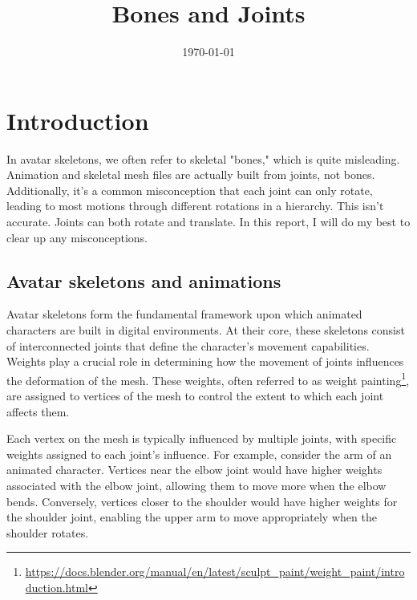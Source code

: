 \documentclass{uva-inf-article}
\title{Bones and Joints}
\date{\today}
\begin{document}
\maketitle


\section{Introduction}
In avatar skeletons, we often refer to skeletal "bones," which is quite misleading. Animation and skeletal mesh files are actually built from joints, not bones. Additionally, it's a common misconception that each joint can only rotate, leading to most motions through different rotations in a hierarchy. This isn't accurate. Joints can both rotate and translate. In this report, I will do my best to clear up any misconceptions.

\subsection{Avatar skeletons and animations}
Avatar skeletons form the fundamental framework upon which animated characters are built in digital environments. At their core, these skeletons consist of interconnected joints that define the character's movement capabilities. Weights play a crucial role in determining how the movement of joints influences the deformation of the mesh. These weights, often referred to as weight painting\footnote{\url{https://docs.blender.org/manual/en/latest/sculpt_paint/weight_paint/introduction.html}}, are assigned to vertices of the mesh to control the extent to which each joint affects them.

Each vertex on the mesh is typically influenced by multiple joints, with specific weights assigned to each joint's influence. For example, consider the arm of an animated character. Vertices near the elbow joint would have higher weights associated with the elbow joint, allowing them to move more when the elbow bends. Conversely, vertices closer to the shoulder would have higher weights for the shoulder joint, enabling the upper arm to move appropriately when the shoulder rotates.
\end{document}
